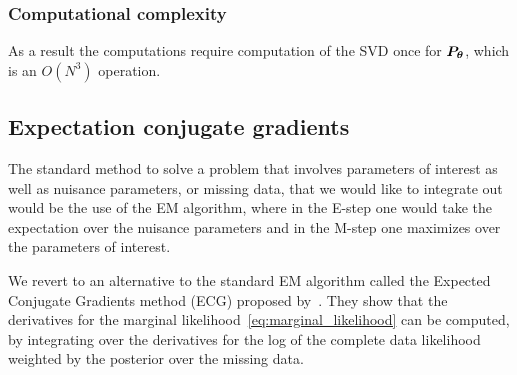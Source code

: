 \documentclass[twoside]{article}
\newcommand{\Pt}{\B{P}_{\B{\theta}}}
\begin{document}
\subsubsection{Computational complexity}
As a result the computations require computation of the SVD once for $\Pt$, which is an $O(N^3)$ operation.

\subsection{Expectation conjugate gradients}
\label{sec:exp_conj_grad}

The standard method to solve a problem that involves parameters of interest as well as nuisance parameters, or missing data, that we would like to integrate out would be the use of the EM algorithm, where in the E-step one would take the expectation over the nuisance parameters and in the M-step one maximizes over the parameters of interest.

We revert to an alternative to the standard EM algorithm called the Expected Conjugate Gradients method (ECG) proposed by~\cite{salakhutdinov2003optimization}. They show that the derivatives for the marginal likelihood~\ref{eq:marginal_likelihood} can be computed, by integrating over the derivatives for the log of the complete data likelihood weighted by the posterior over the missing data.
\end{document}
